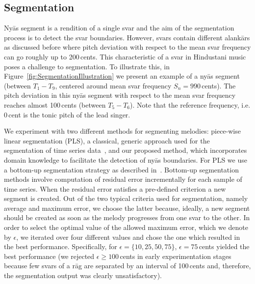 {\subsection{Segmentation}
\label{sec:segmentation}

Ny\={a}s segment is a rendition of a single svar and the aim of the segmentation process is to detect the svar boundaries. However, svars contain different alank\={a}rs as discussed before where pitch deviation with respect to the mean svar frequency can go roughly up to 200\,cents. This characteristic of a svar in Hindustani music poses a challenge to segmentation. To illustrate this, in Figure~\ref{fig:SegmentationIllustration} we present an example of a ny\={a}s segment (between $T_1-T_9$, centered around mean svar frequency $S_n=990$\,cents). The pitch deviation in this ny\={a}s segment with respect to the mean svar frequency reaches almost 100\,cents (between $T_5-T_6$). Note that the reference frequency, i.e. 0\,cent is the tonic pitch of the lead singer.



We experiment with two different methods for segmenting melodies: piece-wise linear segmentation (PLS), a classical, generic approach used for the segmentation of time series data~\cite{keogh2004segmenting}, and our proposed method, which incorporates domain knowledge to facilitate the detection of ny\={a}s boundaries. For PLS we use a bottom-up segmentation strategy as described in~\cite{keogh2004segmenting}. Bottom-up segmentation methods involve computation of residual error incrementally for each sample of time series. When the residual error satisfies a pre-defined criterion a new segment is created. Out of the two typical criteria used for segmentation, namely average and maximum error, we choose the latter because, ideally, a new segment should be created as soon as the melody progresses from one svar to the other. In order to select the optimal value of the allowed maximum error, which we denote by $\epsilon$, we iterated over four different values and chose the one which resulted in the best performance. Specifically, for $\epsilon=\lbrace 10, 25, 50, 75\rbrace$, $\epsilon=75$\,cents yielded the best performance (we rejected $\epsilon\geq 100$\,cents in early experimentation stages because few svars of a r\={a}g are separated by an interval of 100\,cents and, therefore, the segmentation output was clearly unsatisfactory).

}
